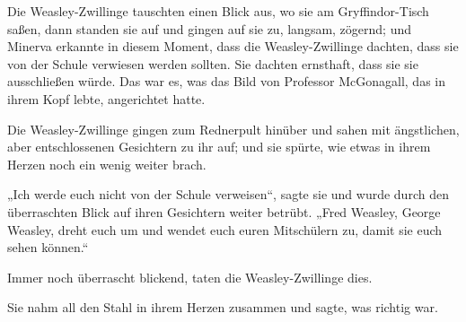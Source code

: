 
Die Weasley-Zwillinge tauschten einen Blick aus, wo sie am Gryffindor-Tisch saßen, dann standen sie auf und gingen auf sie zu, langsam, zögernd; und Minerva erkannte in diesem Moment, dass die Weasley-Zwillinge dachten, dass sie von der Schule verwiesen werden sollten.
Sie dachten ernsthaft, dass sie sie ausschließen würde. Das war es, was das Bild von Professor McGonagall, das in ihrem Kopf lebte, angerichtet hatte.

Die Weasley-Zwillinge gingen zum Rednerpult hinüber und sahen mit ängstlichen, aber entschlossenen Gesichtern zu ihr auf; und sie spürte, wie etwas in ihrem Herzen noch ein wenig weiter brach.

„Ich werde euch nicht von der Schule verweisen“, sagte sie und wurde durch den überraschten Blick auf ihren Gesichtern weiter betrübt.
„Fred Weasley, George Weasley, dreht euch um und wendet euch euren Mitschülern zu, damit sie euch sehen können.“

Immer noch überrascht blickend, taten die Weasley-Zwillinge dies.

Sie nahm all den Stahl in ihrem Herzen zusammen und sagte, was richtig war.

